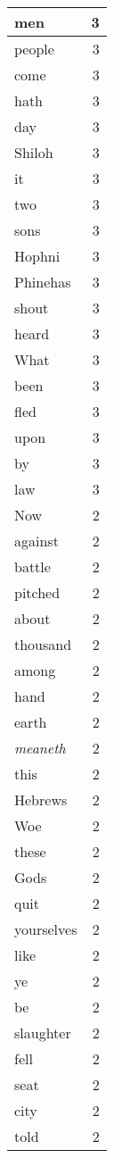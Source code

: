 \begin{center}
\begin{longtable}{l|r}
men & 3 \\ \hline
people & 3 \\ \hline
come & 3 \\ \hline
hath & 3 \\ \hline
day & 3 \\ \hline
Shiloh & 3 \\ \hline
it & 3 \\ \hline
two & 3 \\ \hline
sons & 3 \\ \hline
Hophni & 3 \\ \hline
Phinehas & 3 \\ \hline
shout & 3 \\ \hline
heard & 3 \\ \hline
What & 3 \\ \hline
been & 3 \\ \hline
fled & 3 \\ \hline
upon & 3 \\ \hline
by & 3 \\ \hline
law & 3 \\ \hline
Now & 2 \\ \hline
against & 2 \\ \hline
battle & 2 \\ \hline
pitched & 2 \\ \hline
about & 2 \\ \hline
thousand & 2 \\ \hline
among & 2 \\ \hline
hand & 2 \\ \hline
earth & 2 \\ \hline
\emph{meaneth} & 2 \\ \hline
this & 2 \\ \hline
Hebrews & 2 \\ \hline
Woe & 2 \\ \hline
these & 2 \\ \hline
Gods & 2 \\ \hline
quit & 2 \\ \hline
yourselves & 2 \\ \hline
like & 2 \\ \hline
ye & 2 \\ \hline
be & 2 \\ \hline
slaughter & 2 \\ \hline
fell & 2 \\ \hline
seat & 2 \\ \hline
city & 2 \\ \hline
told & 2 \\ \hline

\end{longtable}
\end{center}
